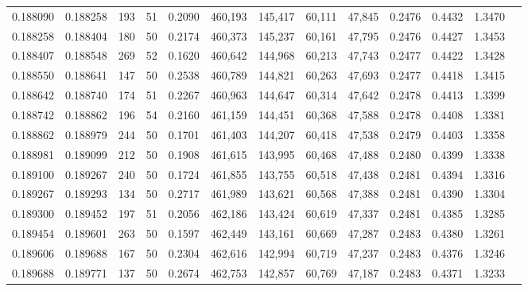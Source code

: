 \begin{tabular}{rrrrrrrrrrrrr}
0.188090 & 0.188258 &   193 &  51 &                                     0.2090 & 460,193 & 145,417 &  60,111 &  47,845 & 0.2476 & 0.4432 & 1.3470 \\
0.188258 & 0.188404 &   180 &  50 &                                     0.2174 & 460,373 & 145,237 &  60,161 &  47,795 & 0.2476 & 0.4427 & 1.3453 \\
0.188407 & 0.188548 &   269 &  52 &                                     0.1620 & 460,642 & 144,968 &  60,213 &  47,743 & 0.2477 & 0.4422 & 1.3428 \\
0.188550 & 0.188641 &   147 &  50 &                                     0.2538 & 460,789 & 144,821 &  60,263 &  47,693 & 0.2477 & 0.4418 & 1.3415 \\
0.188642 & 0.188740 &   174 &  51 &                                     0.2267 & 460,963 & 144,647 &  60,314 &  47,642 & 0.2478 & 0.4413 & 1.3399 \\
0.188742 & 0.188862 &   196 &  54 &                                     0.2160 & 461,159 & 144,451 &  60,368 &  47,588 & 0.2478 & 0.4408 & 1.3381 \\
0.188862 & 0.188979 &   244 &  50 &                                     0.1701 & 461,403 & 144,207 &  60,418 &  47,538 & 0.2479 & 0.4403 & 1.3358 \\
0.188981 & 0.189099 &   212 &  50 &                                     0.1908 & 461,615 & 143,995 &  60,468 &  47,488 & 0.2480 & 0.4399 & 1.3338 \\
0.189100 & 0.189267 &   240 &  50 &                                     0.1724 & 461,855 & 143,755 &  60,518 &  47,438 & 0.2481 & 0.4394 & 1.3316 \\
0.189267 & 0.189293 &   134 &  50 &                                     0.2717 & 461,989 & 143,621 &  60,568 &  47,388 & 0.2481 & 0.4390 & 1.3304 \\
0.189300 & 0.189452 &   197 &  51 &                                     0.2056 & 462,186 & 143,424 &  60,619 &  47,337 & 0.2481 & 0.4385 & 1.3285 \\
0.189454 & 0.189601 &   263 &  50 &                                     0.1597 & 462,449 & 143,161 &  60,669 &  47,287 & 0.2483 & 0.4380 & 1.3261 \\
0.189606 & 0.189688 &   167 &  50 &                                     0.2304 & 462,616 & 142,994 &  60,719 &  47,237 & 0.2483 & 0.4376 & 1.3246 \\
0.189688 & 0.189771 &   137 &  50 &                                     0.2674 & 462,753 & 142,857 &  60,769 &  47,187 & 0.2483 & 0.4371 & 1.3233 \\

\end{tabular}
